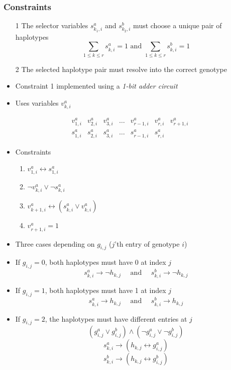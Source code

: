 \documentclass[handout]{beamer}
\begin{document}
\begin{frame}
\frametitle{Constraints}
\begin{itemize}
\item[1] The selector variables $s^a_{k_1,i}$ and $s^b_{k_2, i}$ must choose a unique pair of haplotypes
$$ \sum_{1\leq k \leq r} s^a_{k,i} = 1 \text{ and } \sum_{1\leq k \leq r} s^b_{k,i} = 1 $$
\item[2] The selected haplotype pair must resolve into the correct genotype
\end{itemize}
\end{frame}

\begin{frame}
\begin{itemize}
\item Constraint 1 implemented using a \emph{1-bit adder circuit}
\item Uses variables $v^a_{k, i}$
\end{itemize}
$$ \begin{array}{c|c|c|c|c|c|c}
v^a_{1,i} & v^a_{2,i} & v^a_{3,i} & \dots & v^a_{r-1, i} & v^a_{r, i} & v^a_{r+1, i} \\\hline
s^a_{1, i} & s^a_{2, i} & s^a_{3, i} & \dots & s^a_{r-1, i} & s^a_{r, i} & 
\end{array} $$
\begin{itemize}
\item Constraints
\begin{enumerate}
\item $v^a_{1, i} \leftrightarrow s^a_{1,i}$
\item $\neg v^a_{k,i} \vee \neg s^a_{k,i}$
\item $ v^a_{k+1,i} \leftrightarrow (s^a_{k,i} \vee v^a_{k,i})$
\item $ v^a_{r+1,i} = 1$
\end{enumerate}
\end{itemize}
\end{frame}

\begin{frame}
\begin{itemize}
\item Three cases depending on $g_{i,j}$ ($j$'th entry of genotype $i$)
\item If $g_{i,j} = 0$, both haplotypes must have 0 at index $j$
$$ s^a_{k,i} \rightarrow \neg h_{k,j}\quad \text{ and }\quad s^b_{k,i} \rightarrow \neg h_{k,j} $$ 
\item If $g_{i,j} = 1$, both haplotypes must have 1 at index $j$
$$ s^a_{k,i} \rightarrow h_{k,j}\quad \text{ and }\quad s^b_{k,i} \rightarrow h_{k,j} $$
\item If $g_{i,j} = 2$, the haplotypes must have different entries at $j$
$$ (g^a_{i,j}\vee g^b_{i,j}) \wedge (\neg g^a_{i,j} \vee \neg g^b_{i,j}) $$
$$ s^a_{k,i} \rightarrow (h_{k,j} \leftrightarrow g^a_{i,j}) $$
$$ s^b_{k,i} \rightarrow (h_{k,j} \leftrightarrow g^b_{i,j}) $$
\end{itemize}
\end{frame}
\end{document}
